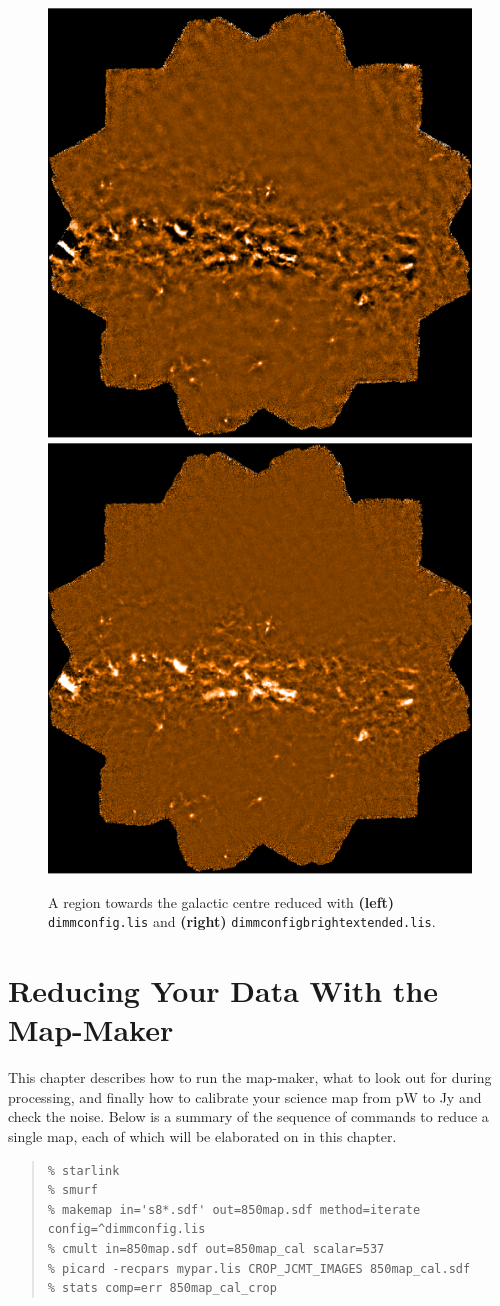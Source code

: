 \documentclass[twoside,11pt]{article}
\newcommand{\xlabel}[1]{}
\renewcommand{\_}{\texttt{\symbol{95}}}
\newenvironment{myquote}{\begin{quote}\begin{small}}{\end{small}\end{quote}}
\begin{document}
\begin{figure}[h!]
\begin{center}
\includegraphics[width=0.47\linewidth]{gal_def}
\hspace{0.3cm}
\includegraphics[width=0.47\linewidth]{gal_brex} 
\caption{\small A region towards the galactic centre reduced with  \textbf{(left)} \texttt{dimmconfig.lis} and \textbf{(right)} \texttt{dimmconfig\_bright\_extended.lis}.}
\label{fig:becompare}
\end{center}
\end{figure}


\clearpage

\section{\xlabel{maps}Reducing Your Data With the Map-Maker}
\label{sec:maps}
This chapter describes how to run the map-maker, what to look out for during processing, and finally how to calibrate your science map from pW to Jy and check the noise. Below is a summary of the sequence of commands to reduce a single map, each of which will be elaborated on in this chapter.
\vspace{-1mm}
\begin{myquote}
\begin{verbatim}
% starlink
% smurf
% makemap in='s8*.sdf' out=850map.sdf method=iterate config=^dimmconfig.lis
% cmult in=850map.sdf out=850map_cal scalar=537
% picard -recpars mypar.lis CROP_JCMT_IMAGES 850map_cal.sdf
% stats comp=err 850map_cal_crop
\end{verbatim}
\end{myquote}
\end{document}
